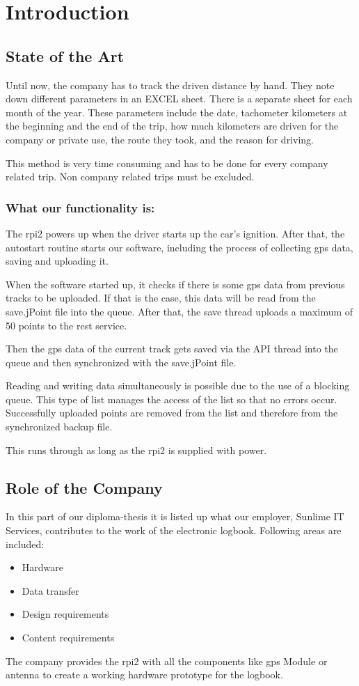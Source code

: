 \newpage
\chapter*{Introduction}
\section*{State of the Art}
Until now, the company has to track the driven distance by hand. They note down different parameters in an EXCEL sheet. There is a separate sheet for each month of the year. These parameters include the date, tachometer kilometers at the beginning and the end of the trip, how much kilometers are driven for the company or private use, the route they took, and the reason for driving.

This method is very time consuming and has to be done for every company related trip. Non company related trips must be excluded.
\subsection*{What our functionality is:}
The \gls{rpi2} powers up when the driver starts up the car's ignition. After that, the autostart routine starts our software, including the process of collecting \gls{gps} data, saving and uploading it.

When the software started up, it checks if there is some \gls{gps} data from previous tracks to be uploaded. If that is the case, this data will be read from the save.jPoint file into the queue. After that, the save thread uploads a maximum of 50 points to the \gls{rest} service. 


Then the \gls{gps} data of the current track gets saved via the API thread into the queue and then synchronized with the save.jPoint file.

Reading and writing data simultaneously is possible due to the use of a blocking queue. This type of list manages the access of the list so that no errors occur.\newline
Successfully uploaded points are removed from the list and therefore from the synchronized backup file.

This runs through as long as the \gls{rpi2} is supplied with power.


\newpage
\section*{Role of the Company}
In this part of our diploma-thesis it is listed up what our employer, Sunlime IT Services, contributes to the work of the electronic logbook. Following areas are included:
\begin{itemize}
\item Hardware
\item Data transfer
\item Design requirements
\item Content requirements
\end{itemize}
The company provides the \gls{rpi2} with all the components like \gls{gps} Module or antenna to create a working hardware prototype for the logbook.

